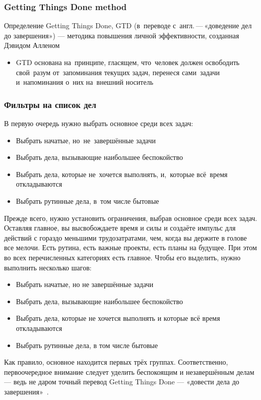 \documentclass{../industrial-development}
\begin{document}
\begin{frame} \frametitle{Getting Things Done method}
  \begin{block}{Определение}
    Getting Things Done, GTD (в~переводе с~англ. — «доведение дел до завершения») --- методика повышения личной эффективности, созданная Дэвидом Алленом
  \end{block}
  \begin{itemize}
  \item GTD основана на~принципе, гласящем, что~человек должен освободить свой~разум от~запоминания текущих задач, перенеся сами~задачи и~напоминания о~них на~внешний носитель
  \end{itemize}
\end{frame}

\begin{frame} \frametitle{Фильтры на список дел}
В первую очередь нужно выбрать основное среди всех задач:
  \begin{itemize}
  \item Выбрать начатые, но~не~завершённые задачи
  \item Выбрать дела, вызывающие наибольшее беспокойство
  \item Выбрать дела, которые не~хочется выполнять, и,~которые всё~время откладываются
  \item Выбрать рутинные дела, в~том числе бытовые
  \end{itemize}
\end{frame}

\lecturenotes

Прежде всего, нужно установить ограничения, выбрав основное среди всех задач. Оставляя главное, вы высвобождаете время и силы и создаёте импульс для действий с гораздо меньшими трудозатратами, чем, когда вы держите в голове все мелочи. Есть рутина, есть важные проекты, есть планы на будущее. При этом во всех перечисленных категориях есть главное. Чтобы его выделить, нужно выполнить несколько шагов:
  \begin{itemize}
  \item Выбрать начатые, но не завершённые задачи
  \item Выбрать дела, вызывающие наибольшее беспокойство
  \item Выбрать дела, которые не хочется выполнять и которые всё время откладываются
  \item Выбрать рутинные дела, в том числе бытовые
  \end{itemize}
Как правило, основное находится первых трёх группах. Соответственно, первоочередное внимание следует уделить беспокоящим и незавершённым делам — ведь не даром точный перевод Getting Things Done — «довести дела до завершения»~\cite{GTDHabr}.
\end{document}
